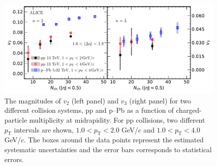 \begin{figure}[!t]
	\centering
\includegraphics[width=1.0\textwidth]{figures/FIG5_v2Mult_allSystems_Data.pdf} 
	\caption{The magnitudes of $v_2$ (left
    panel) and $v_3$ (right panel) 
 for two different collision systems, pp and p--Pb as a function of charged-particle multiplicity at midrapidity. For pp collisions, two different $p_\mathrm{T}$ intervals are shown, $1.0<p_\mathrm{T}<2.0$ GeV/$c$ and $1.0<p_\mathrm{T}<4.0$ GeV/$c$. The boxes around the data points represent the estimated systematic uncertainties and the error bars corresponds to statistical errors.} 
	\label{fig:v2mult}
\end{figure}

